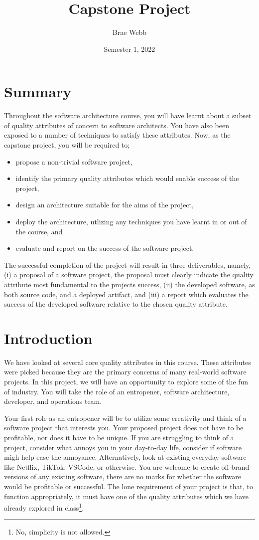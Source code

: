 \documentclass{csse4400}
\title{Capstone Project}
\author{Brae Webb}
\date{Semester 1, 2022}
\begin{document}
\maketitle

\section*{Summary}
Throughout the software architecture course,
you will have learnt about a subset of quality attributes of concern to software architects.
You have also been exposed to a number of techniques to satisfy these attributes.
Now, as the capstone project, you will be required to;
\begin{itemize}
    \item propose a non-trivial software project,
    \item identify the primary quality attributes which would enable success of the project,
    \item design an architecture suitable for the aims of the project,
    \item deploy the architecture, utlizing any techniques you have learnt in or out of the course, and
    \item evaluate and report on the success of the software project.
\end{itemize}

The successful completion of the project will result in three deliverables, namely,
(i) a proposal of a software project, the proposal must clearly indicate the quality attribute most {\color{red} fundamental} to the projects success,
(ii) the developed software, as both source code, and a deployed artifact, and
(iii) a report which evaluates the success of the developed software relative to the chosen quality attribute.

\section{Introduction}
We have looked at several core quality attributes in this course.
These attributes were picked because they are the primary concerns of many real-world software projects.
In this project, we will have an opportunity to explore some of the fun of industry.
You will take the role of an entropener, software architecture, developer, and operations team.

Your first role as an entropener will be to utilize some creativity and think of a software project that interests you.
Your proposed project does not have to be profitable, nor does it have to be unique.
If you are struggling to think of a project, consider what annoys you in your day-to-day life, consider if software migh help ease the annoyance.
Alternatively, look at existing everyday software like Netflix, TikTok, VSCode, or otherwise.
You are welcome to create off-brand versions of any existing software,
there are no marks for whether the software would be profitable or successful.
The lone requirement of your project is that, to function appropriately, it must have one of the quality attributes which we have already explored in class\footnote{No, simplicity is not allowed.}.
\end{document}

